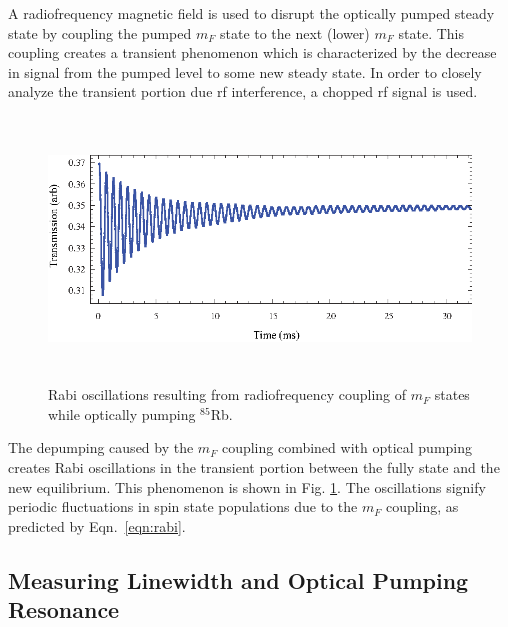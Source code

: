 A radiofrequency magnetic field is used to disrupt the optically pumped steady state by coupling the pumped $m_F$ state to the next (lower) $m_F$ state.  This coupling creates a transient phenomenon which is characterized by the decrease in signal from the pumped level to some new steady state.  In order to closely analyze the transient portion due rf interference, a chopped rf signal is used.  
\begin{figure}[htbp]
\begin{center}
\includegraphics[height=70mm]{./figures/rabi.eps}
\caption{\small{Rabi oscillations resulting from radiofrequency coupling of $m_F$ states while optically pumping $^{85}$Rb.}}
\label{fig:rabi}
\end{center}
\end{figure}
The depumping caused by the $m_F$ coupling combined with optical pumping creates Rabi oscillations in the transient portion between the fully state and the new equilibrium.  This phenomenon is shown in Fig. \ref{fig:rabi}.  The oscillations signify periodic fluctuations in spin state populations due to the $m_F$ coupling, as predicted by Eqn.~\ref{eqn:rabi}.

\subsection{Measuring Linewidth and Optical Pumping Resonance}\label{MeasuringLinewidthandOpticalPumpingResonance}

